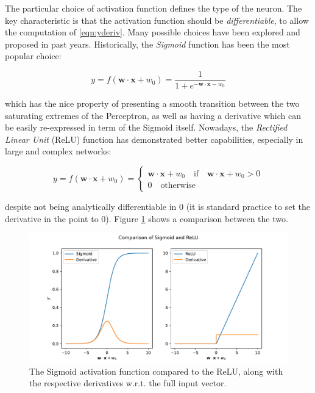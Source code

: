 The particular choice of activation function defines the type of the neuron. The key characteristic is that the activation function should be \emph{differentiable}, to allow the computation of \eqref{eqn:yderiv}. Many possible choices have been explored and proposed in past years.
Historically, the \emph{Sigmoid} function has been the most popular choice:

\[
y=f(\mathbf{w}\cdot\mathbf{x} + w_0) = \frac{1}{1 + e^{-\mathbf{w}\cdot\mathbf{x} - w_0}}
\]

which has the nice property of presenting a smooth transition between the two saturating extremes of the Perceptron, as well as having a derivative which can be easily re-expressed in term of the Sigmoid itself. Nowadays, the \emph{Rectified Linear Unit} (ReLU) function has demonstrated better capabilities, especially in large and complex networks:

\[
y=f(\mathbf{w}\cdot\mathbf{x} + w_0) = 
\begin{cases}
\mathbf{w}\cdot\mathbf{x} + w_0 \quad \text{if} \quad \mathbf{w}\cdot\mathbf{x} + w_0 > 0 \\
0 \quad \text{otherwise}
\end{cases}
\]

despite not being analytically differentiable in $0$ (it is standard practice to set the derivative in the point to $0$). Figure \ref{fig:actfunc} shows a comparison between the two.

\begin{figure}
    \centering
    \includegraphics[width=\columnwidth]{gfx/ch3/activ.pdf}
    \caption[Activation functions]{The Sigmoid activation function compared to the ReLU, along with the respective derivatives w.r.t. the full input vector.}
    \label{fig:actfunc}
\end{figure}

